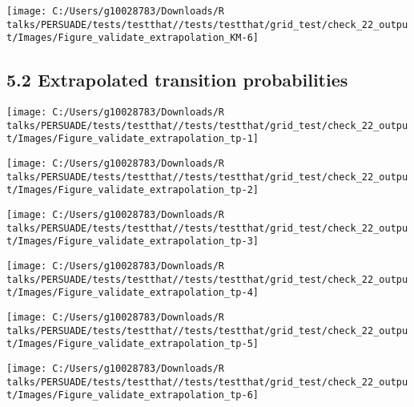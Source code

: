 \documentclass[
]{article}
\begin{document}
\begin{flushleft}\texttt{[image: C:/Users/g10028783/Downloads/R talks/PERSUADE/tests/testthat//tests/testthat/grid\_test/check\_22\_output/Images/Figure\_validate\_extrapolation\_KM-6]} \end{flushleft}

\clearpage

\subsection{5.2 Extrapolated transition
probabilities}\label{extrapolated-transition-probabilities}

\begin{flushleft}\texttt{[image: C:/Users/g10028783/Downloads/R talks/PERSUADE/tests/testthat//tests/testthat/grid\_test/check\_22\_output/Images/Figure\_validate\_extrapolation\_tp-1]} \end{flushleft}

\begin{flushleft}\texttt{[image: C:/Users/g10028783/Downloads/R talks/PERSUADE/tests/testthat//tests/testthat/grid\_test/check\_22\_output/Images/Figure\_validate\_extrapolation\_tp-2]} \end{flushleft}

\begin{flushleft}\texttt{[image: C:/Users/g10028783/Downloads/R talks/PERSUADE/tests/testthat//tests/testthat/grid\_test/check\_22\_output/Images/Figure\_validate\_extrapolation\_tp-3]} \end{flushleft}

\begin{flushleft}\texttt{[image: C:/Users/g10028783/Downloads/R talks/PERSUADE/tests/testthat//tests/testthat/grid\_test/check\_22\_output/Images/Figure\_validate\_extrapolation\_tp-4]} \end{flushleft}

\begin{flushleft}\texttt{[image: C:/Users/g10028783/Downloads/R talks/PERSUADE/tests/testthat//tests/testthat/grid\_test/check\_22\_output/Images/Figure\_validate\_extrapolation\_tp-5]} \end{flushleft}

\begin{flushleft}\texttt{[image: C:/Users/g10028783/Downloads/R talks/PERSUADE/tests/testthat//tests/testthat/grid\_test/check\_22\_output/Images/Figure\_validate\_extrapolation\_tp-6]} \end{flushleft}
\end{document}
